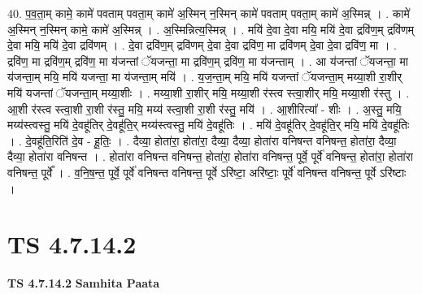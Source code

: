 \documentclass[17pt]{extarticle}
\begin{document}
40. प॒व॒ता॒म् कामे॒ कामे॑ पवताम् पवता॒म् कामे॑ अ॒स्मिन् न॒स्मिन् कामे॑ पवताम् पवता॒म् कामे॑ अ॒स्मिन्न् । . कामे॑ अ॒स्मिन् न॒स्मिन् कामे॒ कामे॑ अ॒स्मिन्न् । . अ॒स्मिन्नित्य॒स्मिन्न् । . मयि॑ दे॒वा दे॒वा मयि॒ मयि॑ दे॒वा द्रवि॑ण॒म् द्रवि॑णम् दे॒वा मयि॒ मयि॑ दे॒वा द्रवि॑णम् । . दे॒वा द्रवि॑ण॒म् द्रवि॑णम् दे॒वा दे॒वा द्रवि॑ण॒ मा द्रवि॑णम् दे॒वा दे॒वा द्रवि॑ण॒ मा । . द्रवि॑ण॒ मा द्रवि॑ण॒म् द्रवि॑ण॒ मा य॑जन्तां ॅयजन्ता॒ मा द्रवि॑ण॒म् द्रवि॑ण॒ मा य॑जन्ताम् । . आ य॑जन्तां ॅयजन्ता॒ मा य॑जन्ता॒म् मयि॒ मयि॑ यजन्ता॒ मा य॑जन्ता॒म् मयि॑ । . य॒ज॒न्ता॒म् मयि॒ मयि॑ यजन्तां ॅयजन्ता॒म् मय्या॒शी रा॒शीर् मयि॑ यजन्तां ॅयजन्ता॒म् मय्या॒शीः । . मय्या॒शी रा॒शीर् मयि॒ मय्या॒शी र॑स्त्व स्त्वा॒शीर् मयि॒ मय्या॒शी र॑स्तु । . आ॒शी र॑स्त्व स्त्वा॒शी रा॒शी र॑स्तु॒ मयि॒ मय्य॑ स्त्वा॒शी रा॒शी र॑स्तु॒ मयि॑ । . आ॒शीरित्या᳚ - शीः । . अ॒स्तु॒ मयि॒ मय्य॑स्त्वस्तु॒ मयि॑ दे॒वहू॑तिर् दे॒वहू॑ति॒र् मय्य॑स्त्वस्तु॒ मयि॑ दे॒वहू॑तिः । . मयि॑ दे॒वहू॑तिर् दे॒वहू॑ति॒र् मयि॒ मयि॑ दे॒वहू॑तिः । . दे॒वहू॑ति॒रिति॑ दे॒व - हू॒तिः॒ । . दैव्या॒ होता॑रा॒ होता॑रा॒ दैव्या॒ दैव्या॒ होता॑रा वनिषन्त वनिषन्त॒ होता॑रा॒ दैव्या॒ दैव्या॒ होता॑रा वनिषन्त । . होता॑रा वनिषन्त वनिषन्त॒ होता॑रा॒ होता॑रा वनिषन्त॒ पूर्वे॒ पूर्वे॑ वनिषन्त॒ होता॑रा॒ होता॑रा वनिषन्त॒ पूर्वे᳚ । . व॒नि॒ष॒न्त॒ पूर्वे॒ पूर्वे॑ वनिषन्त वनिषन्त॒ पूर्वे ऽरि॑ष्टा॒ अरि॑ष्टाः॒ पूर्वे॑ वनिषन्त वनिषन्त॒ पूर्वे ऽरि॑ष्टाः । \newline
\pagebreak
{}

\section{ TS 4.7.14.2 }

\textbf{TS 4.7.14.2 } \newline
\textbf{Samhita Paata} \newline
\end{document}
